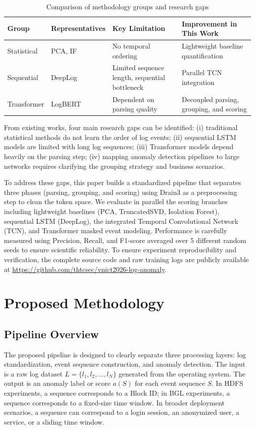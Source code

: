 \documentclass[conference]{IEEEtran}
\begin{document}
\begin{table}[htbp]
\caption{Comparison of methodology groups and research gaps}
\begin{center}
\scriptsize
\setlength{\tabcolsep}{3pt}
\begin{tabular}{lp{1.6cm}p{2.3cm}p{2.1cm}}
\toprule
\textbf{Group} & \textbf{Representatives} & \textbf{Key Limitation} & \textbf{Improvement in This Work} \\
\midrule
Statistical & PCA, IF \cite{b10,b11} & No temporal ordering & Lightweight baseline quantification \\
Sequential & DeepLog \cite{b1,b13} & Limited sequence length, sequential bottleneck & Parallel TCN integration \\
Transformer & LogBERT \cite{b2} & Dependent on parsing quality & Decoupled parsing, grouping, and scoring \\
\bottomrule
\end{tabular}
\label{tab_related_work}
\end{center}
\end{table}

From existing works, four main research gaps can be identified: (i) traditional statistical methods do not learn the order of log events; (ii) sequential LSTM models are limited with long log sequences; (iii) Transformer models depend heavily on the parsing step; (iv) mapping anomaly detection pipelines to large networks requires clarifying the grouping strategy and business scenarios. 

To address these gaps, this paper builds a standardized pipeline that separates three phases (parsing, grouping, and scoring) using Drain3 as a preprocessing step to clean the token space. We evaluate in parallel the scoring branches including lightweight baselines (PCA, TruncatedSVD, Isolation Forest), sequential LSTM (DeepLog), the integrated Temporal Convolutional Network (TCN), and Transformer masked event modeling. Performance is carefully measured using Precision, Recall, and F1-score averaged over 5 different random seeds to ensure scientific reliability. To ensure experiment reproducibility and verification, the complete source code and raw training logs are publicly available at \url{https://github.com/thtcsec/vnict2026-log-anomaly}.

\section{Proposed Methodology}
\subsection{Pipeline Overview}
The proposed pipeline is designed to clearly separate three processing layers: log standardization, event sequence construction, and anomaly detection. The input is a raw log dataset $L=\{l_1,l_2,\ldots,l_N\}$ generated from the operating system. The output is an anomaly label or score $a(S)$ for each event sequence $S$. In HDFS experiments, a sequence corresponds to a Block ID; in BGL experiments, a sequence corresponds to a fixed-size time window. In broader deployment scenarios, a sequence can correspond to a login session, an anonymized user, a service, or a sliding time window.
\end{document}
